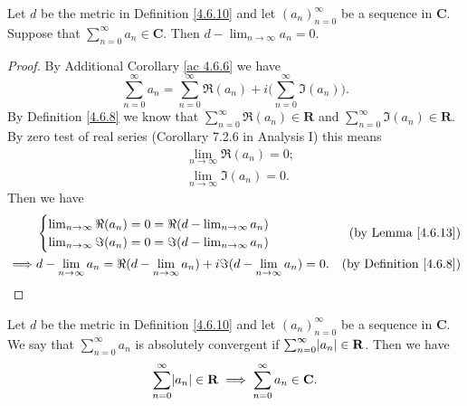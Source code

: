 \begin{additional corollary}\label{ac 4.6.7}
Let \(d\) be the metric in Definition \ref{4.6.10} and let \((a_n)_{n = 0}^\infty\) be a sequence in \(\mathbf{C}\).
Suppose that \(\sum_{n = 0}^\infty a_n \in \mathbf{C}\).
Then \(d - \lim_{n \to \infty} a_n = 0\).
\end{additional corollary}

\begin{proof}
    By Additional Corollary \ref{ac 4.6.6} we have
    \[
        \sum_{n = 0}^\infty a_n = \sum_{n = 0}^\infty \Re(a_n) + i \bigg(\sum_{n = 0}^\infty \Im(a_n)\bigg).
    \]
    By Definition \ref{4.6.8} we know that \(\sum_{n = 0}^\infty \Re(a_n) \in \mathbf{R}\) and \(\sum_{n = 0}^\infty \Im(a_n) \in \mathbf{R}\).
    By zero test of real series (Corollary 7.2.6 in Analysis I) this means
    \begin{align*}
         & \lim_{n \to \infty} \Re(a_n) = 0; \\
         & \lim_{n \to \infty} \Im(a_n) = 0.
    \end{align*}
    Then we have
    \begin{align*}
                 & \begin{cases}
                       \lim_{n \to \infty} \Re(a_n) = 0 = \Re(d - \lim_{n \to \infty} a_n) \\
                       \lim_{n \to \infty} \Im(a_n) = 0 = \Im(d - \lim_{n \to \infty} a_n)
                   \end{cases}                                   & \text{(by Lemma \ref{4.6.13})}                                                                \\
        \implies & d - \lim_{n \to \infty} a_n = \Re(d - \lim_{n \to \infty} a_n) + i \Im(d - \lim_{n \to \infty} a_n) = 0. & \text{(by Definition \ref{4.6.8})}
    \end{align*}
\end{proof}

\begin{additional corollary}\label{ac 4.6.8}
Let \(d\) be the metric in Definition \ref{4.6.10} and let \((a_n)_{n = 0}^\infty\) be a sequence in \(\mathbf{C}\).
We say that \(\sum_{n = 0}^\infty a_n\) is absolutely convergent if \(\sum_{n = 0}^\infty \abs*{a_n} \in \mathbf{R}\).
Then we have
\[
    \sum_{n = 0}^\infty \abs*{a_n} \in \mathbf{R} \implies \sum_{n = 0}^\infty a_n \in \mathbf{C}.
\]
\end{additional corollary}

